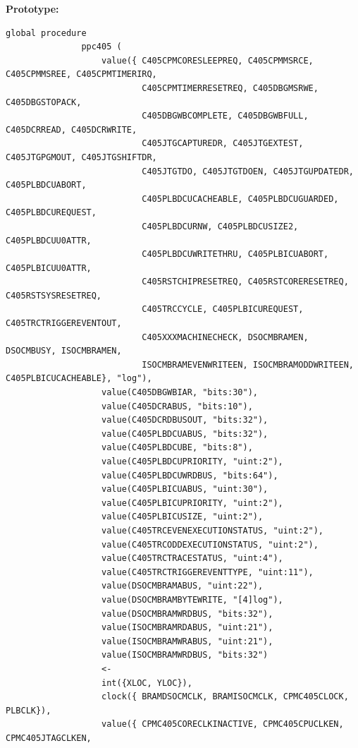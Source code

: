             {\bf Prototype:} \\
            \vsp
            \begin{lstlisting}[gobble=12, language=threepl]
               global procedure
               ppc405 (
                   value({ C405CPMCORESLEEPREQ, C405CPMMSRCE, C405CPMMSREE, C405CPMTIMERIRQ,
                           C405CPMTIMERRESETREQ, C405DBGMSRWE, C405DBGSTOPACK,
                           C405DBGWBCOMPLETE, C405DBGWBFULL, C405DCRREAD, C405DCRWRITE,
                           C405JTGCAPTUREDR, C405JTGEXTEST, C405JTGPGMOUT, C405JTGSHIFTDR,
                           C405JTGTDO, C405JTGTDOEN, C405JTGUPDATEDR, C405PLBDCUABORT,
                           C405PLBDCUCACHEABLE, C405PLBDCUGUARDED, C405PLBDCUREQUEST,
                           C405PLBDCURNW, C405PLBDCUSIZE2, C405PLBDCUU0ATTR,
                           C405PLBDCUWRITETHRU, C405PLBICUABORT, C405PLBICUU0ATTR,
                           C405RSTCHIPRESETREQ, C405RSTCORERESETREQ, C405RSTSYSRESETREQ,
                           C405TRCCYCLE, C405PLBICUREQUEST, C405TRCTRIGGEREVENTOUT,
                           C405XXXMACHINECHECK, DSOCMBRAMEN, DSOCMBUSY, ISOCMBRAMEN,
                           ISOCMBRAMEVENWRITEEN, ISOCMBRAMODDWRITEEN, C405PLBICUCACHEABLE}, "log"),
                   value(C405DBGWBIAR, "bits:30"),
                   value(C405DCRABUS, "bits:10"),
                   value(C405DCRDBUSOUT, "bits:32"),
                   value(C405PLBDCUABUS, "bits:32"),
                   value(C405PLBDCUBE, "bits:8"),
                   value(C405PLBDCUPRIORITY, "uint:2"),
                   value(C405PLBDCUWRDBUS, "bits:64"),
                   value(C405PLBICUABUS, "uint:30"),
                   value(C405PLBICUPRIORITY, "uint:2"),
                   value(C405PLBICUSIZE, "uint:2"),
                   value(C405TRCEVENEXECUTIONSTATUS, "uint:2"),
                   value(C405TRCODDEXECUTIONSTATUS, "uint:2"),
                   value(C405TRCTRACESTATUS, "uint:4"),
                   value(C405TRCTRIGGEREVENTTYPE, "uint:11"),
                   value(DSOCMBRAMABUS, "uint:22"),
                   value(DSOCMBRAMBYTEWRITE, "[4]log"),
                   value(DSOCMBRAMWRDBUS, "bits:32"),
                   value(ISOCMBRAMRDABUS, "uint:21"),
                   value(ISOCMBRAMWRABUS, "uint:21"),
                   value(ISOCMBRAMWRDBUS, "bits:32")
                   <-
                   int({XLOC, YLOC}),
                   clock({ BRAMDSOCMCLK, BRAMISOCMCLK, CPMC405CLOCK, PLBCLK}),
                   value({ CPMC405CORECLKINACTIVE, CPMC405CPUCLKEN, CPMC405JTAGCLKEN, 

\end{lstlisting}

